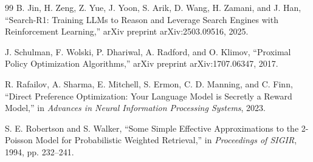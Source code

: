 \documentclass[12pt,a4paper]{article}
\begin{document}
\begin{thebibliography}{99}
B. Jin, H. Zeng, Z. Yue, J. Yoon, S. Arik, D. Wang, H. Zamani, and J. Han, ``Search-R1: Training LLMs to Reason and Leverage Search Engines with Reinforcement Learning,'' arXiv preprint arXiv:2503.09516, 2025.

J. Schulman, F. Wolski, P. Dhariwal, A. Radford, and O. Klimov, ``Proximal Policy Optimization Algorithms,'' arXiv preprint arXiv:1707.06347, 2017.

R. Rafailov, A. Sharma, E. Mitchell, S. Ermon, C. D. Manning, and C. Finn, ``Direct Preference Optimization: Your Language Model is Secretly a Reward Model,'' in \textit{Advances in Neural Information Processing Systems}, 2023.

S. E. Robertson and S. Walker, ``Some Simple Effective Approximations to the 2-Poisson Model for Probabilistic Weighted Retrieval,'' in \textit{Proceedings of SIGIR}, 1994, pp. 232--241.

\end{thebibliography}
\end{document}
